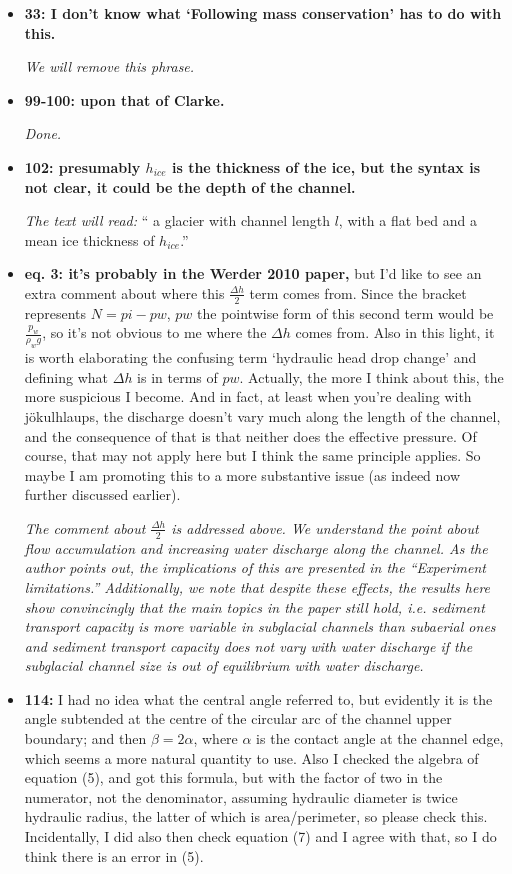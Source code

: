 \documentclass[11pt]{article}
\begin{document}
\begin{itemize}
\item \textbf{33: I don’t know what ‘Following mass conservation’ has to do with this.}

  \textit{We will remove this phrase.}
  
\item \textbf{99-100: upon that of Clarke.}

  \textit{Done.}

\item \textbf{102: presumably $h_{ice}$ is the thickness of the ice, but the syntax is not clear, it could be the depth of the channel.}

  \textit{The text will read:} `` a glacier with channel length $l$, with a flat bed and a mean ice thickness of $h_{ice}$.''
  
\item \textbf{eq. 3: it’s probably in the Werder 2010 paper,} but I’d like to see an extra comment about where this $\frac{\Delta h}{2}$ term comes from.
  Since the bracket represents $N = pi-pw$, $pw$ the pointwise form of this second term would be $\frac{p_w}{\rho_wg}$, so it’s not obvious to me where the $\Delta h$ comes from.
  Also in this light, it is worth elaborating the confusing term ‘hydraulic head drop change’ and defining what $\Delta h$ is in terms of $pw$.
  Actually, the more I think about this, the more suspicious I become. And in fact, at least when you’re dealing with j\"okulhlaups, the discharge doesn’t vary much along the length of the channel, and the consequence of that is that neither does the effective pressure.
  Of course, that may not apply here but I think the same principle applies.
  So maybe I am promoting this to a more substantive issue
  (as indeed now further discussed earlier).

  \textit{The comment about $\frac{\Delta h}{2}$ is addressed above. We understand the point about flow accumulation and increasing water discharge along the channel. As the author points out, the implications of this are presented in the ``Experiment limitations.'' Additionally, we note that despite these effects, the results here show convincingly that the main topics in the paper still hold, i.e. sediment transport capacity is more variable in subglacial channels than subaerial ones and sediment transport capacity does not vary with water discharge if the subglacial channel size is out of equilibrium with water discharge. }


\item \textbf{114:} I had no idea what the central angle referred to, but evidently it is the angle subtended at the centre of the circular arc of the channel upper boundary; and then $\beta = 2\alpha$, where $\alpha$ is the contact angle at the channel edge, which seems a more natural quantity to use. Also I checked the algebra of equation (5), and got this formula, but with the factor of two in the numerator, not the denominator, assuming hydraulic diameter is twice hydraulic radius, the latter of which is area/perimeter, so please check this. Incidentally, I did also then check equation (7) and I agree with that, so I do think there is an error in (5).


\end{itemize}
\end{document}
